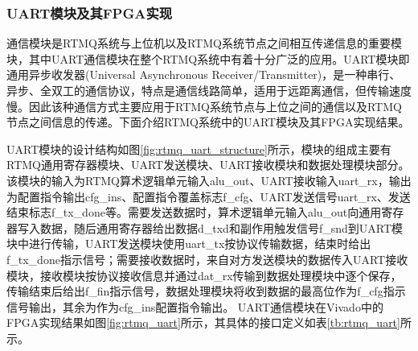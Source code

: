 \subsubsection[UART模块及其FPGA实现]{UART模块及其FPGA实现}
通信模块是RTMQ系统与上位机以及RTMQ系统节点之间相互传递信息的重要模块，其中UART通信模块在整个RTMQ系统中有着十分广泛的应用。UART模块即通用异步收发器(Universal Asynchronous Receiver/Transmitter)，是一种串行、异步、全双工的通信协议，特点是通信线路简单，适用于远距离通信，但传输速度慢。因此该种通信方式主要应用于RTMQ系统节点与上位之间的通信以及RTMQ节点之间信息的传递。下面介绍RTMQ系统中的UART模块及其FPGA实现结果。



UART模块的设计结构如图\ref{fig:rtmq_uart_structure}所示，模块的组成主要有RTMQ通用寄存器模块、UART发送模块、UART接收模块和数据处理模块部分。
该模块的输入为RTMQ算术逻辑单元输入alu\_out、UART接收输入uart\_rx，输出为配置指令输出cfg\_ins、配置指令覆盖标志f\_cfg、UART发送信号uart\_rx、发送结束标志f\_tx\_done等。需要发送数据时，算术逻辑单元输入alu\_out向通用寄存器写入数据，随后通用寄存器给出数据d\_txd和副作用触发信号f\_snd到UART模块中进行传输，UART发送模块使用uart\_tx按协议传输数据，结束时给出f\_tx\_done指示信号；需要接收数据时，来自对方发送模块的数据传入UART接收模块，接收模块按协议接收信息并通过dat\_rx传输到数据处理模块中逐个保存，传输结束后给出f\_fin指示信号，数据处理模块将收到数据的最高位作为f\_cfg指示信号输出，其余为作为cfg\_ins配置指令输出。
UART通信模块在Vivado中的FPGA实现结果如图\ref{fig:rtmq_uart}所示，其具体的接口定义如表\ref{tb:rtmq_uart}所示。


